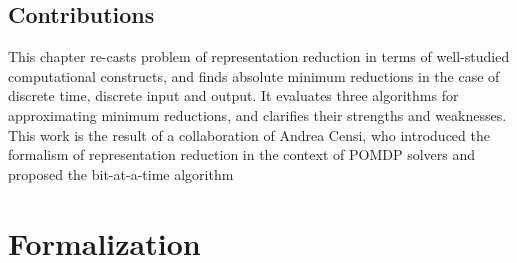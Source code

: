 \subsection{Contributions}
This chapter re-casts problem of representation reduction in terms of well-studied computational constructs,
and finds absolute minimum reductions in the case of discrete time, discrete input and output.
It evaluates three algorithms for approximating minimum reductions, and clarifies their strengths and weaknesses.
This work is the result of a collaboration of Andrea Censi, 
who introduced the formalism of representation reduction in the context of POMDP solvers
and proposed the bit-at-a-time algorithm
\section{Formalization}

